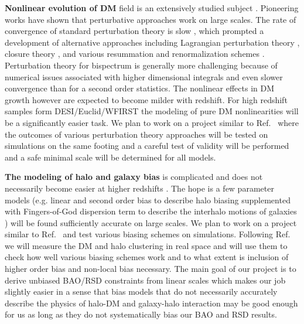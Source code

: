 \textbf{Nonlinear evolution of DM} field is an extensively studied subject
\cite{1981MNRAS.197..931J,1983MNRAS.203..345V,1986ApJ...311....6G,1992PhRvD..46..585M,1994ApJ...431..495J}.
Pioneering works have shown that perturbative approaches work on large scales.
The rate of convergence of standard perturbation theory is slow , which
prompted a development of alternative approaches including Lagrangian
perturbation theory
\cite{1992MNRAS.254..729B,1993MNRAS.264..375B,1994MNRAS.267..811B,1995A&A...296..575B},
closure theory
\cite{2007PhRvD..75d3514M,2008ApJ...674..617T,2008JCAP...10..036P}, and various
resummation and renormalization schemes
\cite{2006PhRvD..73f3519C,2006PhRvD..73f3520C,2008PhRvD..77b3533C}.
Perturbation theory for bispectrum is generally more challenging because of
numerical issues associated with higher dimensional integrals and even slower
convergence than for a second order statistics. The nonlinear effects in DM
growth however are expected to become milder with redshift. For high redshift
samples form DESI/Euclid/WFIRST the modeling of pure DM nonlinearities will be
a significantly easier task. We plan to work on a project similar to
Ref.~\cite{2009PhRvD..80d3531C} where the outcomes of various perturbation
theory approaches will be tested on simulations on the same footing and a
careful test of validity will be performed and a safe minimal scale will be
determined for all models.

\textbf{The modeling of halo and galaxy bias} is complicated and does not
necessarily become easier at higher redshifts \cite{2018PhR...733....1D}. The
hope is a few parameter models (e.g.  linear and second order bias to describe
halo biasing \cite{1993ApJ...413..447F,2012PhRvD..85h3509C,2012PhRvD..86h3540B}
supplemented with Fingers-of-God dispersion term to describe the interhalo
motions of galaxies
\cite{1972MNRAS.156P...1J,2005ApJ...630....1Z,2016MNRAS.455L..77H}) will be
found sufficiently accurate on large scales. We plan to work on a project
similar to Ref.~\cite{2009ApJ...691..569J} and test various biasing schemes on
simulations.  Following Ref.~\cite{2009ApJ...691..569J} we will measure the DM
and halo clustering in real space and will use them to check how well various
biasing schemes work and to what extent is inclusion of higher order bias and
non-local bias necessary. The main goal of our project is to derive unbiased
BAO/RSD constraints from linear scales which makes our job slightly easier in a
sense that bias models that do not necessarily accurately describe the physics
of halo-DM and galaxy-halo interaction may be good enough for us as long as
they do not systematically bias our BAO and RSD results.

